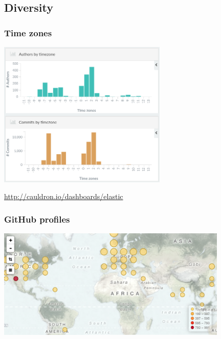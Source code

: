\documentclass[17pt,aspectratio=169,hyperref=pdfusetitle]{beamer}
\begin{document}
\subsection{Diversity}


\begin{frame}
\frametitle{Time zones}

\begin{center}
  \includegraphics[height=7cm]{figs/elastic-git-tz}
\end{center}

\begin{flushright}
  \url{http://cauldron.io/dashboards/elastic}
\end{flushright}
      
\end{frame}


\begin{frame}
\frametitle{GitHub profiles}

\begin{center}
  \includegraphics[width=11cm]{figs/map-commits-elasticsearch}
\end{center}

\end{frame}
\end{document}
